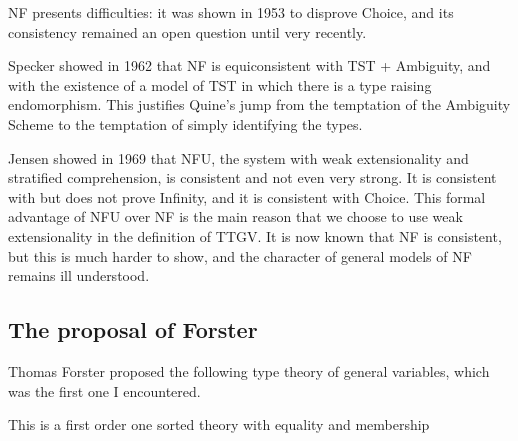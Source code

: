 \documentclass[12pt]{article}
\begin{document}
NF presents difficulties:  it was shown in 1953 to disprove Choice, and its consistency remained an open question until very recently.

Specker showed in 1962 that NF is equiconsistent with TST + Ambiguity, and with the existence of a model of TST in which there is a type raising endomorphism.  This justifies Quine's jump from the temptation of the Ambiguity Scheme to the temptation of simply identifying the types.

Jensen showed in 1969 that NFU, the system with weak extensionality and stratified comprehension, is consistent and not even very strong.  It is consistent with but does not prove Infinity, and it is consistent with Choice.  This formal advantage of NFU over NF is the main reason that we choose to use weak extensionality in the definition of TTGV.  It is now known that NF is consistent, but this is much harder to show, and the character of general models of NF remains ill understood.

\subsection{The proposal of Forster}

Thomas Forster proposed the following type theory of general variables, which was the first one I encountered. %

This is a first order one sorted theory with equality and membership
\end{document}
